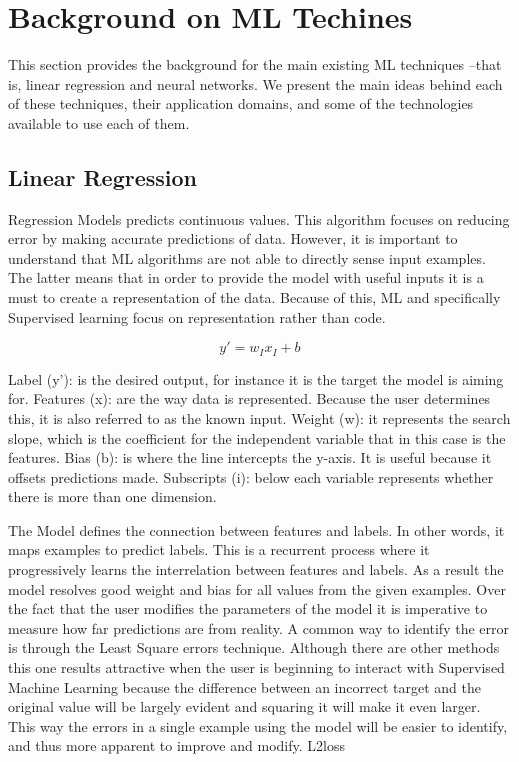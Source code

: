 

\section{Background on \acl{ML} Techines}
\label{sec:related}

This section provides the background for the main existing \ac{ML} techniques --that is, linear 
regression and neural networks. We present the main ideas behind each of these techniques, their 
application domains, and some of the technologies available to use each of them. 

\subsection{Linear Regression}

Regression Models predicts continuous values. This algorithm focuses on reducing error by making accurate predictions of data. However, it is important to understand that ML algorithms are not able to directly sense input examples. The latter means that in order to provide the model with useful inputs it is a must to create a representation of the data. Because of this, ML and specifically Supervised learning focus on representation rather than code. 

\[
y' = w_Ix_I + b
\]

Label (y’): is the desired output, for instance it is the target the model is aiming for.
Features (x):  are the way data is represented. Because the user determines this, it is also referred to as the known input.  
Weight (w):  it represents the search slope, which is the coefficient for the independent variable that in this case is the features.  
Bias (b): is where the line intercepts the y-axis. It is useful because it offsets predictions made. 
Subscripts (i): below each variable represents whether there is more than one dimension.

The Model defines the connection between features and labels. In other words, it maps examples to predict labels. This is a recurrent process where it progressively learns the interrelation between features and labels. As a result the model resolves good weight and bias for all values from the given examples.  Over the fact that the user modifies the parameters of the model it is imperative to measure how far predictions are from reality.  A common way to identify the error is through the Least Square errors technique. Although there are other methods this one results attractive when the user is beginning to interact with Supervised Machine Learning because the difference between an incorrect target and the original value will be largely evident and squaring it will make it even larger. This way the errors in a single example using the model will be easier to identify, and thus more apparent to improve and modify.
L2loss


